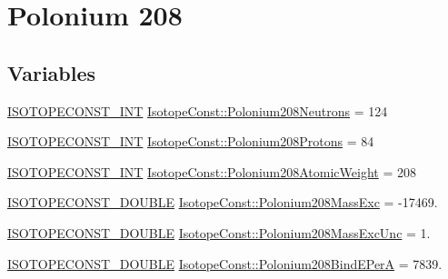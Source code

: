 \hypertarget{group___isotope_const-_polonium-_po208}{}\section{Polonium 208}
\label{group___isotope_const-_polonium-_po208}
\subsection*{Variables}
\begin{DoxyCompactItemize}
\item 
\mbox{\hyperlink{group___isotope_const-_macros_ga5f18360b3e99483a35c32d789e62621c}{I\+S\+O\+T\+O\+P\+E\+C\+O\+N\+S\+T\+\_\+\+I\+NT}} \mbox{\hyperlink{group___isotope_const-_polonium-_po208_ga91fc546791030041e203716a948b1eab}{Isotope\+Const\+::\+Polonium208\+Neutrons}} = 124
\item 
\mbox{\hyperlink{group___isotope_const-_macros_ga5f18360b3e99483a35c32d789e62621c}{I\+S\+O\+T\+O\+P\+E\+C\+O\+N\+S\+T\+\_\+\+I\+NT}} \mbox{\hyperlink{group___isotope_const-_polonium-_po208_ga805e1c6c1e3922ac61264a9cd2312dc9}{Isotope\+Const\+::\+Polonium208\+Protons}} = 84
\item 
\mbox{\hyperlink{group___isotope_const-_macros_ga5f18360b3e99483a35c32d789e62621c}{I\+S\+O\+T\+O\+P\+E\+C\+O\+N\+S\+T\+\_\+\+I\+NT}} \mbox{\hyperlink{group___isotope_const-_polonium-_po208_gad11a6bf74790259ce008fa529bb3d7e1}{Isotope\+Const\+::\+Polonium208\+Atomic\+Weight}} = 208
\item 
\mbox{\hyperlink{group___isotope_const-_macros_ga8f45a7272ce02c0b4c65c44636ed719a}{I\+S\+O\+T\+O\+P\+E\+C\+O\+N\+S\+T\+\_\+\+D\+O\+U\+B\+LE}} \mbox{\hyperlink{group___isotope_const-_polonium-_po208_ga9eacea449a6b2a9767123df6db94b894}{Isotope\+Const\+::\+Polonium208\+Mass\+Exc}} = -\/17469.
\item 
\mbox{\hyperlink{group___isotope_const-_macros_ga8f45a7272ce02c0b4c65c44636ed719a}{I\+S\+O\+T\+O\+P\+E\+C\+O\+N\+S\+T\+\_\+\+D\+O\+U\+B\+LE}} \mbox{\hyperlink{group___isotope_const-_polonium-_po208_gac49d9b8cb3e61f77f4d9b2424881a5d2}{Isotope\+Const\+::\+Polonium208\+Mass\+Exc\+Unc}} = 1.
\item 
\mbox{\hyperlink{group___isotope_const-_macros_ga8f45a7272ce02c0b4c65c44636ed719a}{I\+S\+O\+T\+O\+P\+E\+C\+O\+N\+S\+T\+\_\+\+D\+O\+U\+B\+LE}} \mbox{\hyperlink{group___isotope_const-_polonium-_po208_ga1ad0b19437e8099ac7565dec01a1b500}{Isotope\+Const\+::\+Polonium208\+Bind\+E\+PerA}} = 7839.
\item 

\end{DoxyCompactItemize}
